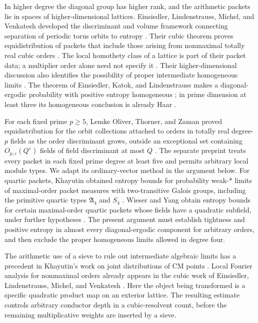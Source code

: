 In higher degree the diagonal group has higher rank, and the arithmetic
packets lie in spaces of higher-dimensional lattices.  Einsiedler,
Lindenstrauss, Michel, and Venkatesh developed the discriminant and volume
framework connecting separation of periodic torus orbits to entropy
\cite{ELMV2009}.  Their cubic theorem proves equidistribution of packets
that include those arising from nonmaximal totally real cubic orders
\cite[Theorem~1.4]{ELMV2011}.  The local homothety class of a lattice is
part of their packet data; a multiplier order alone need not specify it
\cite[Section~5.5]{ELMV2011}.  Their higher-dimensional discussion also
identifies the possibility of proper intermediate homogeneous limits
\cite[Section~1.6.3]{ELMV2011}.  The theorem of Einsiedler, Katok, and
Lindenstrauss makes a diagonal-ergodic probability with positive entropy
homogeneous \cite[Theorem~1.3]{EKL2006}; in prime dimension at least three
its homogeneous conclusion is already Haar \cite[Corollary~1.4]{EKL2006}.

For each fixed prime $p\ge5$, Lemke Oliver, Thorner, and Zaman proved
equidistribution for the orbit collections attached to orders in totally
real degree-$p$ fields as the order discriminant grows, outside an
exceptional set containing $O_{p,\varepsilon}(Q^\varepsilon)$ fields of
field discriminant at most $Q$ \cite[Theorem~2.3]{LOTZ2024}.
The separate preprint \cite[Theorem~1.1]{PrimeDegreePackets} treats every
packet in each fixed prime degree at least five and permits arbitrary local module types.
We adapt its ordinary-vector method in the argument below.
For quartic packets, Khayutin obtained entropy bounds for probability
weak-$*$ limits of maximal-order packet measures with two-transitive Galois
groups, including the primitive quartic types $\mathfrak A_4$ and $S_4$
\cite[Theorem~1.1]{Khayutin2019Tori}.  Wieser and Yang obtain entropy bounds
for certain maximal-order quartic packets whose fields have a quadratic
subfield, under further hypotheses \cite{WieserYang2026}.  The present
argument must establish tightness and positive entropy in almost every
diagonal-ergodic component for arbitrary orders, and then exclude the
proper homogeneous limits allowed in degree four.

The arithmetic use of a sieve to rule out intermediate algebraic limits
has a precedent in Khayutin's work on joint distributions of CM points
\cite{Khayutin2019CM}.  Local Fourier analysis for nonmaximal orders already
appears in the cubic work of Einsiedler, Lindenstrauss, Michel, and Venkatesh
\cite[Proposition~9.9]{ELMV2011}.  Here the object being transformed is a
specific quadratic product map on an exterior lattice.  The resulting
estimate controls arbitrary conductor depth in a cubic-resolvent count,
before the remaining multiplicative weights are inserted by a sieve.

